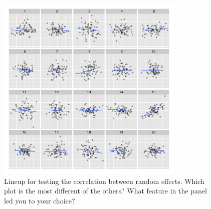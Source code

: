 \documentclass[12pt]{article} %
\newcommand{\alnote}[1]{\todo[inline,color=green!40]{#1}} %
\begin{document}
\begin{figure}[hbt]
	\centering
	\includegraphics[width=0.8\textwidth]{examcorr-15.pdf}
	\caption{\label{fig:ranef-corr} Lineup for testing the correlation between random effects. Which plot is the most different of the others? What feature in the panel led you to your choice?}
\end{figure}

%


\end{document}
